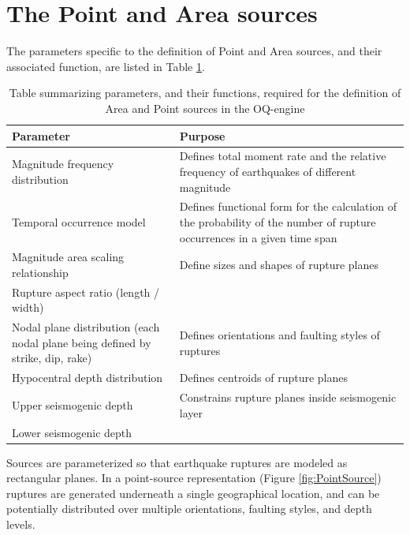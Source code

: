 \section{The Point and Area sources}
The parameters specific to the definition of Point and Area sources, and their
associated function, are listed in Table \ref{table:point_area_tab}.
\begin{table}
\centering
\caption{Table summarizing parameters, and their functions, required for the
definition of Area and Point sources in the OQ-engine}
\begin{tabular}{|p{60mm} p{60mm}|}
\hline
\rowcolor{anti-flashwhite}
\bf{Parameter} & \bf{Purpose} \\ \hline
Magnitude frequency distribution & Defines total moment rate and the relative
frequency of earthquakes of different magnitude\\ 
\hline
Temporal occurrence model & Defines functional form for the calculation of
the probability of the number of rupture occurrences in a given time span\\ 
\hline
Magnitude area scaling relationship & Define sizes and shapes of rupture planes \\
Rupture aspect ratio (length / width) & \\
\hline
Nodal plane distribution \newline (each nodal plane being defined \newline by
strike, dip, rake) & Defines orientations and faulting styles of ruptures \\
\hline
Hypocentral depth distribution &  Defines centroids of rupture planes \\
\hline
Upper seismogenic depth & Constrains rupture planes inside seismogenic layer \\
Lower seismogenic depth & \\
\hline %
\end{tabular}
\label{table:point_area_tab}
\end{table}
Sources are parameterized so that earthquake ruptures are modeled as rectangular
planes. In a point-source representation (Figure \ref{fig:PointSource}) ruptures
are generated underneath a single geographical location, and can be potentially
distributed over multiple orientations, faulting styles, and depth levels.
